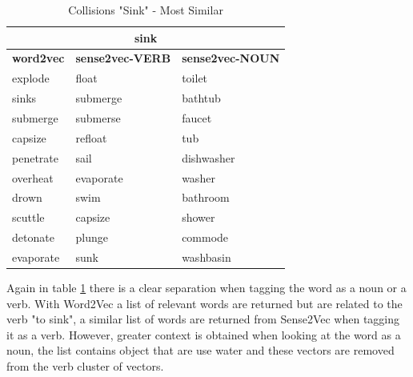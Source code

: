 \begin{table}[h]
\centering
\begin{tabular}{|l|l|l|}
\hline
\multicolumn{3}{|c|}{\textbf{sink}}                                                                                                   \\ \hline
\multicolumn{1}{|c|}{\textbf{word2vec}} & \multicolumn{1}{c|}{\textbf{sense2vec-VERB}} & \multicolumn{1}{c|}{\textbf{sense2vec-NOUN}} \\ \hline
explode                                 & float                                        & toilet                                       \\ \hline
sinks                                   & submerge                                     & bathtub                                      \\ \hline
submerge                                & submerse                                     & faucet                                       \\ \hline
capsize                                 & refloat                                      & tub                                          \\ \hline
penetrate                               & sail                                         & dishwasher                                   \\ \hline
overheat                                & evaporate                                    & washer                                       \\ \hline
drown                                   & swim                                         & bathroom                                     \\ \hline
scuttle                                 & capsize                                      & shower                                       \\ \hline
detonate                                & plunge                                       & commode                                      \\ \hline
evaporate                               & sunk                                         & washbasin                                    \\ \hline
\end{tabular}
\caption{Collisions "Sink" - Most Similar}
\label{Collisions "Sink" - Most Similar}
\end{table}

\noindent
Again in table \ref{Collisions "Sink" - Most Similar} there is a clear separation when tagging the word as a noun or a verb. With Word2Vec a list of relevant words are returned but are related to the verb "to sink", a similar list of words are returned from Sense2Vec when tagging it as a verb. However, greater context is obtained when looking at the word as a noun, the list contains object that are use water and these vectors are removed from the verb cluster of vectors.

